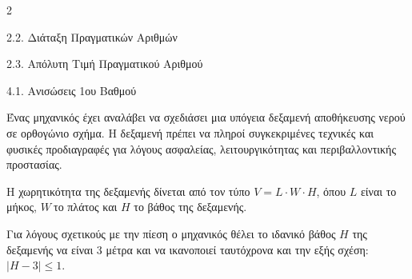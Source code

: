 \begin{ylh}{2}
    \item 2.2. Διάταξη Πραγματικών Αριθμών
    \item 2.3. Απόλυτη Τιμή Πραγματικού Αριθμού
    \item 4.1. Ανισώσεις 1ου Βαθμού
\end{ylh}

Ένας μηχανικός έχει αναλάβει να σχεδιάσει μια υπόγεια δεξαμενή αποθήκευσης νερού σε ορθογώνιο σχήμα. Η δεξαμενή πρέπει να πληροί συγκεκριμένες τεχνικές και φυσικές προδιαγραφές για λόγους ασφαλείας, λειτουργικότητας και περιβαλλοντικής προστασίας.

Η χωρητικότητα της δεξαμενής δίνεται από τον τύπο $V = L \cdot W \cdot H$, όπου $L$ είναι το μήκος, $W\ $το πλάτος και $H$ το βάθος της δεξαμενής.

Για λόγους σχετικούς με την πίεση ο μηχανικός θέλει το ιδανικό βάθος $H$ της δεξαμενής να είναι $3$ μέτρα και να ικανοποιεί ταυτόχρονα και την εξής σχέση: $\mid H - 3 \mid \leq 1$.

